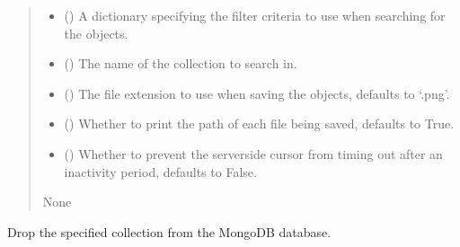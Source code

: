 \documentclass[letterpaper,10pt,english]{sphinxmanual}
\begin{document}
\begin{fulllineitems}
\begin{fulllineitems}
\begin{quote}
\begin{description}
\begin{itemize}
\item {} 
\sphinxAtStartPar
{} () \textendash{} A dictionary specifying the filter criteria to use when searching for the objects.

\item {} 
\sphinxAtStartPar
{} () \textendash{} The name of the collection to search in.

\item {} 
\sphinxAtStartPar
{} (\sphinxstyleliteralemphasis{\sphinxupquote{, }}) \textendash{} The file extension to use when saving the objects, defaults to ‘.png’.

\item {} 
\sphinxAtStartPar
{} (\sphinxstyleliteralemphasis{\sphinxupquote{, }}) \textendash{} Whether to print the path of each file being saved, defaults to True.

\item {} 
\sphinxAtStartPar
{} (\sphinxstyleliteralemphasis{\sphinxupquote{, }}) \textendash{} Whether to prevent the server\sphinxhyphen{}side cursor from timing out after an inactivity period,
defaults to False.

\end{itemize}

\sphinxAtStartPar
None

\end{description}\end{quote}

\end{fulllineitems}


\begin{fulllineitems}
\label{\detokenize{forensicfit.database.database:forensicfit.database.database.Database.drop_collection}}
\pysigstartsignatures
{}
\pysigstopsignatures
\sphinxAtStartPar
Drop the specified collection from the MongoDB database.


\end{fulllineitems}
\end{fulllineitems}
\end{document}
